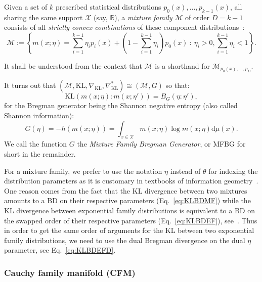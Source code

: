 \documentclass[graybox]{svmult}
\def\dmu{\mathrm{d}\mu}
\def\KL{\mathrm{KL}}
\def\eqdef{:=}
\def\bbR{\mathbb{R}}
\def\calX{\mathcal{X}}
\def\calM{\mathcal{M}}
\def\st{{\ :\ }}
\begin{document}
	\begin{definition}\label{def:mf}
	Given a set of $k$ prescribed statistical distributions $p_0(x),\ldots, p_{k-1}(x)$, all sharing the same support $\calX$ (say, $\bbR$), a
 {\em mixture family} $\calM$ of order $D=k-1$ consists of all {\em strictly convex combinations} of these component distributions~\cite{wmixture-2017,geowmixtures-2018}:
\begin{equation}
\calM \eqdef  \left\{ m(x;\eta)= \sum_{i=1}^{k-1} \eta_ip_i(x)+ (1-\sum_{i=1}^{k-1} \eta_i)p_0(x) \st \eta_i>0, \sum_{i=1}^{k-1} \eta_i<1 \right\}.
\end{equation}
\end{definition}
It shall be understood from the context that $\calM$ is a shorthand for $\calM_{p_0(x),\ldots, p_{D}}$.


	It turns out that $(\calM,\KL,\nabla_\KL,\nabla_\KL^*)\cong (\calM,G)$ so that:
	\begin{equation}\label{eq:KLBDMF}
\KL(m(x;\eta):m(x;\eta')) = B_G(\eta:\eta'),
\end{equation}
for the Bregman generator being the Shannon negative entropy (also called Shannon information):
\begin{equation}\label{eq:negent}
G(\eta)=-h(m(x;\eta))=\int_{x\in\calX} m(x;\eta)\log m(x;\eta) \dmu(x).
\end{equation}
	We call the function $G$ the {\em Mixture Family Bregman Generator}, or MFBG for short in the remainder.
	
	For a mixture family, we prefer to use the notation $\eta$ instead of  $\theta$ for indexing the distribution parameters as it is customary in  textbooks of information geometry~\cite{IG-2014,IG-2016}.
One reason comes from the fact that the KL divergence between two mixtures amounts to a BD on their respective parameters (Eq.~\ref{eq:KLBDMF}) while the KL divergence between exponential family distributions is equivalent to a BD on the swapped order of their respective parameters (Eq.~\ref{eq:KLBDEF}), see~\cite{AW-KLBD-2001,Frongillo-2014}. Thus in order to get the same order of arguments for the KL between  two  exponential family distributions, we need to use the dual Bregman divergence on the dual $\eta$ parameter, see Eq.~\ref{eq:KLBDEFD}.

	
	
	
\subsubsection{Cauchy family manifold (CFM)}
\end{document}

